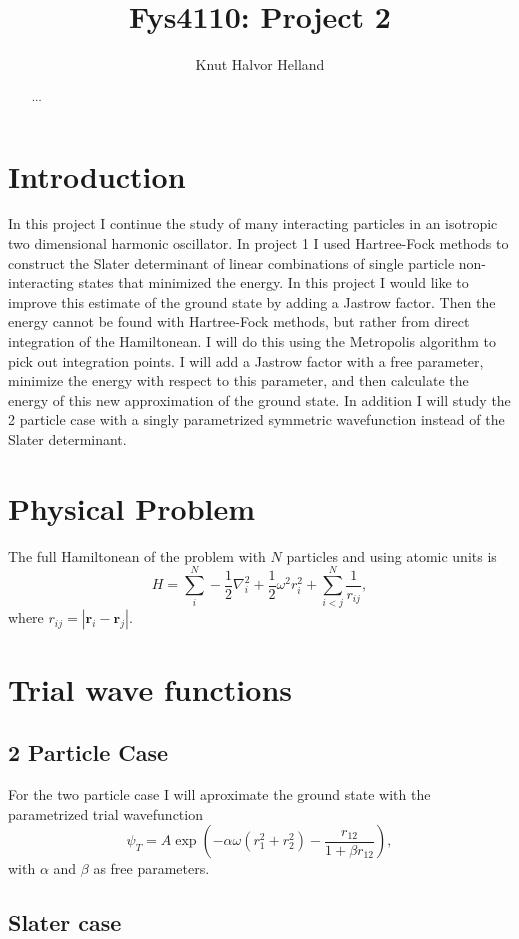 \documentclass[a4paper,norsk,10pt]{article}
\title{Fys4110: Project 2}
\author{Knut Halvor Helland}
\newcommand{\bb}[1]{\boldsymbol{#1}}
\newcommand{\be}{\begin{equation}}
\newcommand{\ee}{\end{equation}}
\newcommand{\f}{\frac}
\begin{document}
\maketitle{}
\begin{abstract}
$\ldots$
\end{abstract}


\section{Introduction}
In this project I continue the study of many interacting particles in an isotropic two dimensional harmonic oscillator.
In project 1 \cite{proj1} I used Hartree-Fock methods to construct the Slater determinant of linear combinations of single
particle non-interacting states that minimized the energy. In this project I would like to improve this estimate of the ground state
by adding a Jastrow factor. Then the energy cannot be found with Hartree-Fock methods, but rather from direct integration of the Hamiltonean.
I will do this using the Metropolis algorithm to pick out integration points.
I will add a Jastrow factor with a free parameter, minimize the energy with respect to this parameter, and
then calculate the energy of this new approximation of the ground state.
In addition I will study the 2 particle case with a singly parametrized symmetric wavefunction instead of the Slater determinant.


\section{Physical Problem}
The full Hamiltonean of the problem with $N$ particles and using atomic units is
\be
H = \sum_i^N -\f{1}{2}\nabla^2_i + \f{1}{2}\omega^2r^2_i + \sum_{i<j}^N\f{1}{r_{ij}}, \label{ham}
\ee
where $r_{ij} = |\bb{r}_i-\bb{r}_j|$.


\section{Trial wave functions}
\subsection{2 Particle Case}
For the two particle case I will aproximate the ground state with the parametrized trial wavefunction
\be
\psi_T = A\exp\left(-\alpha\omega(r_1^2 + r_2^2) -\f{r_{12}}{1+\beta r_{12}}\right),\label{2pw}
\ee
with $\alpha$ and $\beta$ as free parameters.

\subsection{Slater case}
\end{document}
